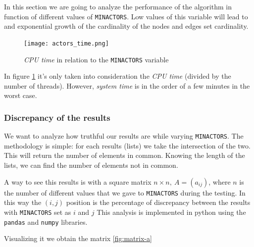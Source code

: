 In this section we are going to analyze the performance of the algorithm in function of different values of \texttt{MIN\textunderscore ACTORS}. Low values of this variable will lead to and exponential growth of the cardinality of the nodes and edges set cardinality.
\newpage

\begin{figure}[h!]
    \centering
    \texttt{[image: actors\_time.png]}
    \caption{\emph{CPU time} in relation to the \texttt{MIN\textunderscore ACTORS} variable}
    \label{fig:actors_time}
\end{figure}

\nd In figure \ref{fig:actors_time} it's only taken into consideration the \emph{CPU time} (divided by the number of threads). However, \emph{system time} is in the order of a few minutes in the worst case.



\subsubsection{Discrepancy of the results}
We want to analyze how truthful our results are while varying \texttt{MIN\textunderscore ACTORS}. The methodology is simple: for each results (lists) we take the intersection of the two. This will return the number of elements in common. Knowing the length of the lists, we can find the number of elements not in common. \s

\nd A way to see this results is with a square matrix $n \times n, ~ A = (a_{ij})$, where $n$ is the number of different values that we gave to \texttt{MIN\textunderscore ACTORS} during the testing. In this way the $(i,j)$ position is the percentage of discrepancy between the results with \texttt{MIN\textunderscore ACTORS} set as $i$ and $j$ \s
\newpage
\nd This analysis is implemented in python using the \texttt{pandas} and \texttt{numpy} libraries.



\nd Visualizing it we obtain the matrix \ref{fig:matrix-a}

